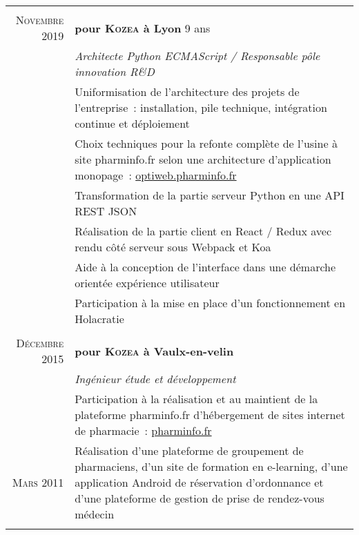 \documentclass[a4paper,10pt]{article}
\begin{document}
  \begin{supertabular}{r|p{11cm}}
     \\
    \textsc{Novembre} 2019  & \textbf{pour \textsc{Kozea} à Lyon} \footnotesize{9 ans} \\
    & \emph{Architecte Python ECMAScript / Responsable pôle innovation R\&D} \\
    & \footnotesize{
      Uniformisation de l’architecture des projets de l’entreprise :
      installation, pile technique, intégration continue et déploiement
    } \\
    & \footnotesize{
      Choix techniques pour la refonte complète de l’usine à site pharminfo.fr
      selon une architecture d’application monopage :
      \href{https://optiweb.pharminfo.fr}{optiweb.pharminfo.fr}
    } \\
    & \footnotesize{
      Transformation de la partie serveur Python en une API REST JSON
    } \\
    & \footnotesize{
      Réalisation de la partie client en React / Redux avec rendu côté serveur
      sous Webpack et Koa
    } \\
    & \footnotesize{
      Aide à la conception de l’interface dans une démarche orientée expérience
      utilisateur
    } \\
    & \footnotesize{
      Participation à la mise en place d’un fonctionnement en Holacratie
    } \\
    \\
    \footnotesize{\textsc{Décembre} 2015} & \textbf{pour \textsc{Kozea} à Vaulx-en-velin} \\
    & \emph{Ingénieur étude et développement} \\
    & \footnotesize{
      Participation à la réalisation et au maintient de la plateforme
      pharminfo.fr d’hébergement de sites internet de pharmacie :
      \href{https://www.pharminfo.fr}{pharminfo.fr}
    } \\
     \footnotesize{\textsc{Mars} 2011}
    & \begin{minipage}[b]{0.85\textwidth}
      \footnotesize{
        Réalisation d’une plateforme de groupement de pharmaciens,
        d’un site de formation en e-learning,
        d’une application Android de réservation d’ordonnance et
        d’une plateforme de gestion de prise de rendez-vous médecin
      }
    \end{minipage} \\

     \\


\end{supertabular}
\end{document}
